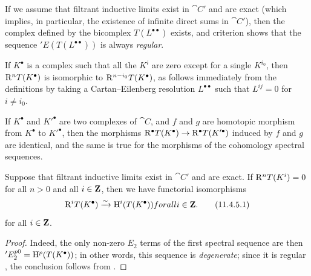 \begin{env}[11.4.3]
If we assume that filtrant inductive limits exist in $\cat{C}'$ and are exact (which implies, in particular, the existence of infinite direct sums in $\cat{C}'$), then the complex defined by the bicomplex $T(L^{\bullet\bullet})$ exists, and criterion  shows that the sequence $'E(T(L^{\bullet\bullet}))$ is always \emph{regular}.

If $K^\bullet$ is a complex such that all the $K^i$ are zero except for a single $K^{i_0}$, then
$\mathrm{R}^n T(K^\bullet)$ is isomorphic to $\mathrm{R}^{n-i_0} T(K^\bullet)$, as follows immediately from the definitions by taking a Cartan--Eilenberg resolution $L^{\bullet\bullet}$ such that $L^{ij}=0$ for $i\neq i_0$.

If $K^\bullet$ and $K'^\bullet$ are two complexes of $\cat{C}$, and $f$ and $g$ are homotopic morphism from $K^\bullet$ to $K'^\bullet$, then the morphisms $\mathrm{R}^\bullet T(K^\bullet) \rightarrow \mathrm{R}^\bullet T(K'^\bullet)$ induced by $f$ and $g$ are identical, and the same is true for the morphisms of the cohomology spectral sequences.
\end{env}

\begin{proposition}[11.4.5]
\label{0.11.4.5}
Suppose that filtrant inductive limits exist in $\cat{C}'$ and are exact.
If $\mathrm{R}^n T(K^i) = 0$ for all $n>0$ and all $i\in\mathbf{Z}$, then we have functorial isomorphisms
\[
\label{0.11.4.5.1}
  \mathrm{R}^i T(K^\bullet) \xrightarrow{\sim} \mathrm{H}^i(T(K^\bullet))
for all i\in\mathbf{Z}.
\tag{11.4.5.1}
\]
for all $i\in\mathbf{Z}$.
\end{proposition}

\begin{proof}
Indeed, the only non-zero $E_2$ terms of the first spectral sequence  are then $'E_2^{p0} = \mathrm{H}^p(T(K^\bullet))$;
in other words, this sequence is \emph{degenerate};
since it is regular , the conclusion follows from .
\end{proof}

